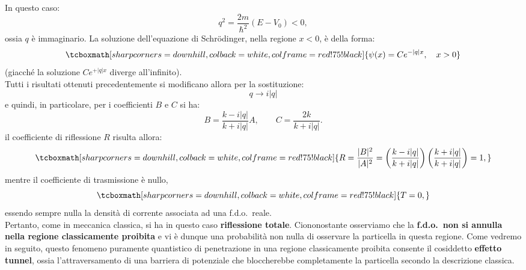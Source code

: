 \documentclass[a4paper,12pt,oneside]{book}
\begin{document}
In questo caso:
	\begin{equation}
		q^2=\frac{2m}{\hbar ^2}\left( E- V_0 \right)<0,
	\end{equation}
ossia $q$ è immaginario. La soluzione dell'equazione di Schr\"{o}dinger, nella regione $x<0$, è della forma:
	\begin{equation}
		\tcboxmath[sharp corners=downhill, colback=white, colframe=red!75!black]{	
			\psi (x) = Ce^{-|q|x}, \quad x>0
			}
	\end{equation}
(giacché la soluzione $\displaystyle{Ce^{+|q|x}}$ diverge all'infinito).\\
Tutti i risultati ottenuti precedentemente si modificano allora per la sostituzione:
	\begin{equation}
		q \rightarrow i|q|
	\end{equation}
e quindi, in particolare, per i coefficienti $B$ e $C$ si ha:
	\begin{equation}
		B=\frac{k-i|q|}{k+i|q|}A, \qquad C=\frac{2k}{k+i|q|}.
	\end{equation}
il coefficiente di riflessione $R$ risulta allora:
	\begin{equation}
		\tcboxmath[sharp corners=downhill, colback=white, colframe=red!75!black]{	
			R=\frac{|B|^2}{|A|^2}=\left(\frac{k-i|q|}{k+i|q|}\right)\left(\frac{k+i|q|}{k+i|q|}\right)=1,
			}
	\end{equation}
mentre il coefficiente di trasmissione è nullo,
	\begin{equation}
		\tcboxmath[sharp corners=downhill, colback=white, colframe=red!75!black]{			
			T=0,
			}
	\end{equation}
essendo sempre nulla la densità di corrente associata ad una f.d.o.~reale.\\

Pertanto, come in meccanica classica, si ha in questo caso \textbf{riflessione totale}. Ciononostante osserviamo che la \textbf{f.d.o.~non si annulla nella regione classicamente proibita} e vi è dunque una probabilità non nulla di osservare la particella in questa regione. Come vedremo in seguito, questo fenomeno puramente quantistico di penetrazione in una regione classicamente proibita consente il cosiddetto \textbf{effetto tunnel}, ossia l'attraversamento di una barriera di potenziale che bloccherebbe completamente la particella secondo la descrizione classica.
\end{document}
